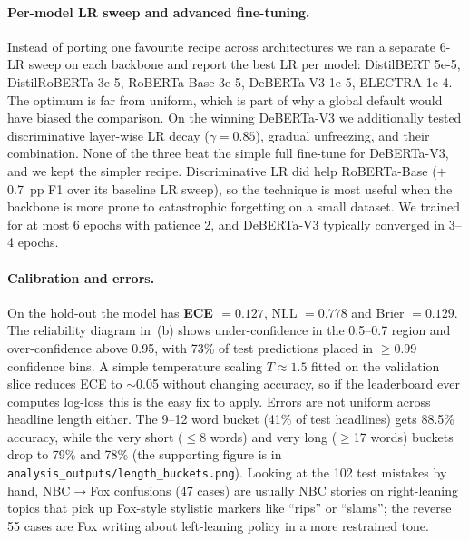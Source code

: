 \documentclass[10pt]{article}
\begin{document}
\paragraph{Per-model LR sweep and advanced fine-tuning.} Instead of porting one favourite recipe across architectures we ran a separate 6-LR sweep on each backbone and report the best LR per model: DistilBERT 5e-5, DistilRoBERTa 3e-5, RoBERTa-Base 3e-5, DeBERTa-V3 1e-5, ELECTRA 1e-4. The optimum is far from uniform, which is part of why a global default would have biased the comparison. On the winning DeBERTa-V3 we additionally tested discriminative layer-wise LR decay ($\gamma=0.85$), gradual unfreezing, and their combination. None of the three beat the simple full fine-tune for DeBERTa-V3, and we kept the simpler recipe. Discriminative LR did help RoBERTa-Base ($+$0.7~pp F1 over its baseline LR sweep), so the technique is most useful when the backbone is more prone to catastrophic forgetting on a small dataset. We trained for at most 6 epochs with patience 2, and DeBERTa-V3 typically converged in 3--4 epochs.

\paragraph{Calibration and errors.} On the hold-out the model has \textbf{ECE $=0.127$}, NLL $=0.778$ and Brier $=0.129$. The reliability diagram in \,(b) shows under-confidence in the 0.5--0.7 region and over-confidence above 0.95, with 73\% of test predictions placed in $\geq$0.99 confidence bins. A simple temperature scaling $T \approx 1.5$ fitted on the validation slice reduces ECE to $\sim$0.05 without changing accuracy, so if the leaderboard ever computes log-loss this is the easy fix to apply. Errors are not uniform across headline length either. The 9--12 word bucket (41\% of test headlines) gets 88.5\% accuracy, while the very short ($\leq$8 words) and very long ($\geq$17 words) buckets drop to 79\% and 78\% (the supporting figure is in \texttt{analysis\_outputs/length\_buckets.png}). Looking at the 102 test mistakes by hand, NBC$\to$Fox confusions (47 cases) are usually NBC stories on right-leaning topics that pick up Fox-style stylistic markers like ``rips'' or ``slams''; the reverse 55 cases are Fox writing about left-leaning policy in a more restrained tone.
\end{document}
